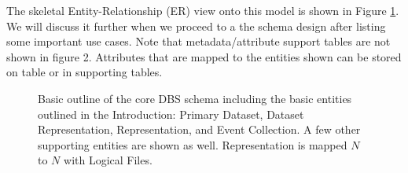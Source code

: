 \documentclass{cmspaper}
\begin{document}
The skeletal Entity-Relationship (ER) view onto this model is
shown in Figure \ref{fig:highlevel}. We will discuss it further when
we proceed to a the schema design after listing some important use
cases.  Note that metadata/attribute support tables are not shown 
in figure 2. Attributes that are mapped to the entities shown can be 
stored on table or in supporting tables.

\begin{figure}[hbtp]
  \begin{center}
    \caption{Basic outline of the core DBS schema including the basic entities outlined 
in the Introduction: Primary Dataset, Dataset Representation, Representation, 
and Event Collection.  A few other supporting entities are shown as well.  Representation 
is mapped $N$ to $N$ with Logical Files. }
    \label{fig:highlevel}
  \end{center}
\end{figure}
\end{document}
